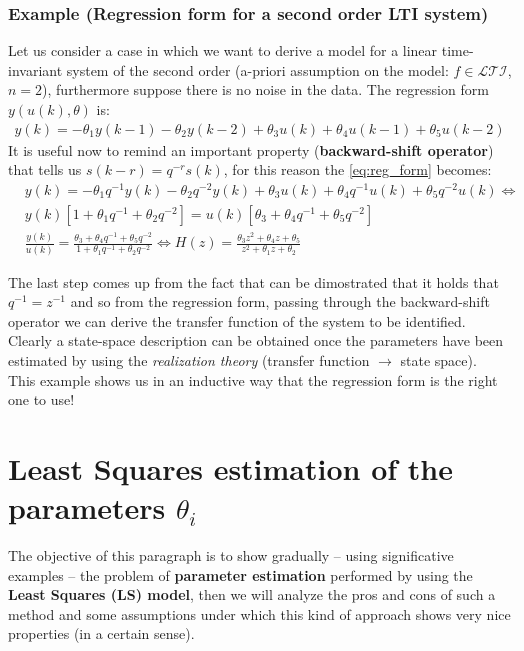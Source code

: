 \subsubsection{Example (Regression form for a second order LTI system)}
Let us consider a case in which we want to derive a model for a linear time-invariant system of the second order (a-priori assumption on the model: $f\in\mathcal{LTI}$, $n=2$), furthermore suppose there is no noise in the data. The regression form $y(u(k),\theta)$ is:
\begin{equation}\label{eq:reg_form}
    \begin{aligned}
        y(k)=-\theta_1{y(k-1)}-\theta_2{y(k-2)}+\theta_3{u(k)}+\theta_4{u(k-1)}+\theta_5{u(k-2)} 
    \end{aligned}
\end{equation}
It is useful now to remind an important property (\textbf{backward-shift operator}) that tells us $s(k-r)=q^{-r}s(k)$, for this reason the \ref{eq:reg_form} becomes:
\begin{align*}
    &y(k)=-\theta_1{q^{-1}} y(k) -\theta_2{q^{-2}}y(k)+\theta_3{u(k)}+\theta_4{q^{-1}}u(k)+\theta_5{q^{-2}}u(k) \iff\\
    &y(k)[1+\theta_1{q^{-1}}+\theta_2{q^{-2}}] = u(k) [\theta_3+\theta_4{q^{-1}}+\theta_5{q^{-2}}] \\
    & \frac{y(k)}{u(k)}=\frac{\theta_3+\theta_4{q^{-1}}+\theta_5{q^{-2}}}{1+\theta_1{q^{-1}}+\theta_2{q^{-2}}} \iff
    H(z) = \frac{\theta_3{z^2}+\theta_4{z}+\theta_5}{z^2+\theta_1{z}+\theta_2}
\end{align*}

\noindent
The last step comes up from the fact that can be dimostrated that it holds that $q^{-1}=z^{-1}$ and so from the regression form, passing through the backward-shift operator we can derive the transfer function of the system to be identified. Clearly a state-space description can be obtained once the parameters have been estimated by using the \textit{realization theory}  (transfer function $\to$ state space). \\

\noindent
This example shows us in an inductive way that the regression form is the right one to use!

\section{Least Squares estimation of the parameters $\theta_i$}
The objective of this paragraph is to show gradually -- using significative examples -- the problem of \textbf{parameter estimation} performed by using the \textbf{Least Squares (LS) model}, then we will analyze the pros and cons of such a method and some assumptions under which this kind of approach shows very nice properties (in a certain sense).

